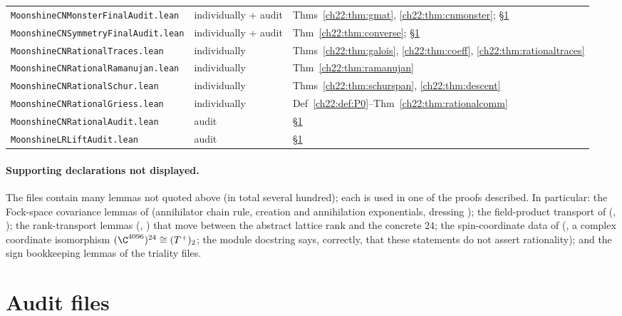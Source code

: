 \begin{center}
\begin{longtable}{p{}p{}p{}}
\texttt{MoonshineCNMonsterFinalAudit.lean} & individually + audit & Thms~\ref{ch22:thm:gmat}, \ref{ch22:thm:cnmonster}; \S\ref{ch22:sec:audits}\\
\texttt{MoonshineCNSymmetryFinalAudit.lean} & individually + audit & Thm~\ref{ch22:thm:converse}; \S\ref{ch22:sec:audits}\\
\texttt{MoonshineCNRationalTraces.lean} & individually & Thms~\ref{ch22:thm:galois}, \ref{ch22:thm:coeff}, \ref{ch22:thm:rationaltraces}\\
\texttt{MoonshineCNRationalRamanujan.lean} & individually & Thm~\ref{ch22:thm:ramanujan}\\
\texttt{MoonshineCNRationalSchur.lean} & individually & Thms~\ref{ch22:thm:schurspan}, \ref{ch22:thm:descent}\\
\texttt{MoonshineCNRationalGriess.lean} & individually & Def~\ref{ch22:def:P0}--Thm~\ref{ch22:thm:rationalcomm}\\
\texttt{MoonshineCNRationalAudit.lean} & audit & \S\ref{ch22:sec:audits}\\
\texttt{MoonshineLRLiftAudit.lean} & audit & \S\ref{ch22:sec:audits}\\
\bottomrule
\end{longtable}
\end{center}

\paragraph{Supporting declarations not displayed.}  The files contain many lemmas not quoted above (in total several hundred);
each is used in one of the proofs described.  In particular: the Fock-space covariance lemmas of
 (annihilator chain rule, creation and annihilation exponentials, dressing
); the field-product transport of  (,
); the rank-transport lemmas (, ) that move between
the abstract lattice rank and the concrete $24$; the spin-coordinate data of 
(, a complex coordinate isomorphism $(\C^{4096})^{24}\cong(T^+)_2$; the module docstring says, correctly, that
these statements do not assert rationality); and the sign bookkeeping lemmas of the triality files.

\section{Audit files}\label{ch22:sec:audits}

